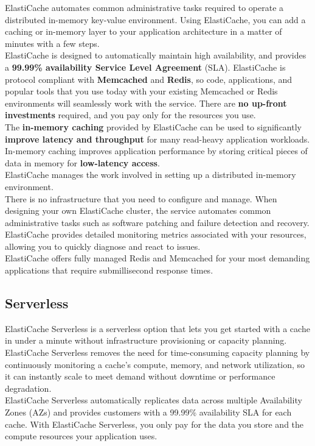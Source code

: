 \documentclass[12pt, letterpaper, twoside]{article}
\begin{document}
ElastiCache automates common administrative tasks required to operate a distributed in-memory key-value environment. 
Using ElastiCache, you can add a caching or in-memory layer to your application architecture in a matter of minutes with a few steps.\\
 
ElastiCache is designed to automatically maintain high availability, and provides a \textbf{99.99\% availability Service Level 
Agreement} (SLA). ElastiCache is protocol compliant with \textbf{Memcached} and \textbf{Redis}, so code, applications, and popular tools 
that you use today with your existing Memcached or Redis environments will seamlessly work with the service. 
There are \textbf{no up-front investments} required, and you pay only for the resources you use.\\

The \textbf{in-memory caching} provided by ElastiCache can be used to significantly \textbf{improve latency and throughput} 
for many read-heavy application workloads.\\
In-memory caching improves application performance by storing critical pieces of data in memory for \textbf{low-latency access}.\\

ElastiCache manages the work involved in setting up a distributed in-memory environment.\\
There is no infrastructure that you need to configure and manage. When designing your own ElastiCache cluster, the service 
automates common administrative tasks such as software patching and failure detection and recovery.\\ ElastiCache provides 
detailed monitoring metrics associated with your resources, allowing you to quickly diagnose and react to issues.\\

ElastiCache offers fully managed Redis and Memcached for your most demanding applications that require submillisecond 
response times.\\

\subsection{Serverless}
ElastiCache Serverless is a serverless option that lets you get started with a cache in under a minute without infrastructure 
provisioning or capacity planning. ElastiCache Serverless removes the need for time-consuming capacity planning by continuously 
monitoring a cache’s compute, memory, and network utilization, so it can instantly scale to meet demand without downtime
or performance degradation.\\
ElastiCache Serverless automatically replicates data across multiple Availability Zones (AZs) and provides customers with a
99.99\% availability SLA for each cache. With ElastiCache Serverless, you only pay for the data you store and the compute 
resources your application uses.\\
\end{document}
